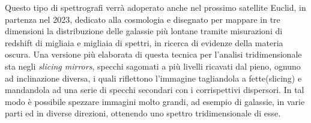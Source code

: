 Questo tipo di spettrografi verrà adoperato anche nel prossimo satellite Euclid, in partenza nel 2023, dedicato alla cosmologia e disegnato per mappare in tre dimensioni la distribuzione delle galassie più lontane tramite misurazioni di redshift di migliaia e migliaia di spettri, in ricerca di evidenze della materia oscura. Una versione più elaborata di questa tecnica per l'analisi tridimensionale sta negli \textit{slicing mirrors}, specchi sagomati a più livelli ricavati dal pieno, ognuno ad inclinazione diversa, i quali riflettono l'immagine tagliandola a fette(slicing) e mandandola ad una serie di specchi secondari con i corrispettivi dispersori. In tal modo è possibile spezzare immagini molto grandi, ad esempio di galassie, in varie parti ed in diverse direzioni, ottenendo uno spettro tridimensionale di esse.